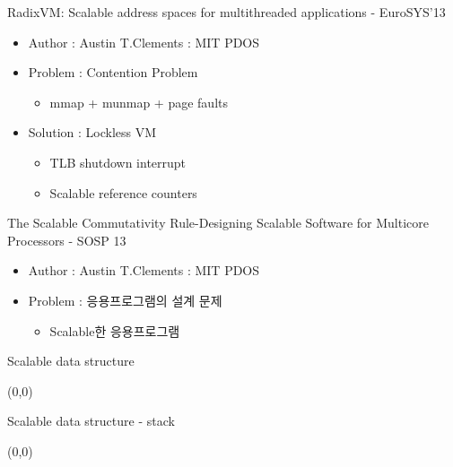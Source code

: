\documentclass[english]{beamer} %
\begin{document}
\begin{frame}{RadixVM: Scalable address spaces for multithreaded applications -
EuroSYS’13}
    \begin{itemize}
    \item Author : Austin T.Clements : MIT PDOS
    \item Problem : Contention Problem
        \begin{itemize}
        \item mmap + munmap + page faults 
        \end{itemize}
    \item Solution : Lockless VM
        \begin{itemize}
        \item TLB shutdown interrupt
        \item Scalable reference counters
        \end{itemize}
    \end{itemize}
\end{frame}

\begin{frame}{The Scalable Commutativity Rule-Designing Scalable Software for
Multicore Processors - SOSP 13 }
    \begin{itemize}
    \item Author : Austin T.Clements : MIT PDOS
    \item Problem : 응용프로그램의 설계 문제
        \begin{itemize}
        \item Scalable한 응용프로그램
        \end{itemize}
    \end{itemize}
\end{frame}

\begin{frame}{Scalable data structure}
\begin{textblock}{1}(0,0)
\end{textblock}
\end{frame}


\begin{frame}{Scalable data structure - stack}
\begin{textblock}{1}(0,0)
\end{textblock}
\end{frame}
\end{document}
